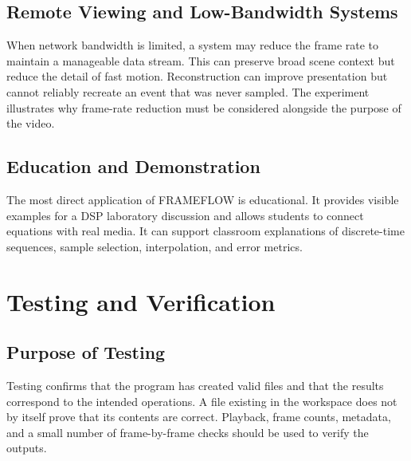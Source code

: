 \documentclass[12pt,a4paper,oneside]{report}
\begin{document}
\section{Remote Viewing and Low-Bandwidth Systems}
When network bandwidth is limited, a system may reduce the frame rate to maintain a manageable data stream. This can preserve broad scene context but reduce the detail of fast motion. Reconstruction can improve presentation but cannot reliably recreate an event that was never sampled. The experiment illustrates why frame-rate reduction must be considered alongside the purpose of the video.

\section{Education and Demonstration}
The most direct application of FRAMEFLOW is educational. It provides visible examples for a DSP laboratory discussion and allows students to connect equations with real media. It can support classroom explanations of discrete-time sequences, sample selection, interpolation, and error metrics.

\chapter{Testing and Verification}
\section{Purpose of Testing}
Testing confirms that the program has created valid files and that the results correspond to the intended operations. A file existing in the workspace does not by itself prove that its contents are correct. Playback, frame counts, metadata, and a small number of frame-by-frame checks should be used to verify the outputs.
\end{document}
